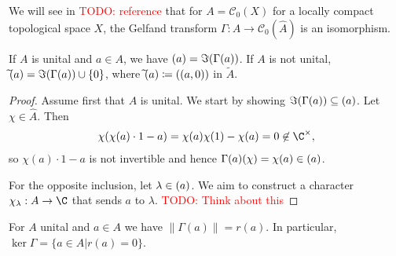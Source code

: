 \documentclass[american]{scrartcl}
\newcommand{\todo}[1]{\textcolor{red}{TODO: #1}}
\renewcommand{\norm}[1]{\left\lVert #1 \right\rVert}
\newcommand{\cC}{\mathcal{C}}
\let\sp\relax
\begin{document}
\begin{example}
	We will see in \todo{reference} that for $A=\cC_0(X)$ for a locally compact topological space $X$, the Gelfand transform $\Gamma\colon A\to \cC_0(\hat{A})$ is an isomorphism.
\end{example}
\begin{proposition}
	If $A$ is unital and $a\in A$, we have $\sp(a)=\Im(\Gamma(a))$. If $A$ is not unital, $\widetilde{\sp}(a)=\Im(\Gamma(a))\cup\{0\}$, where $\widetilde{\sp}(a)\coloneqq \sp{((a,0))}$ in $\tilde{A}$.
\end{proposition}
\begin{proof}
	Assume first that $A$ is unital. We start by showing $\Im(\Gamma(a))\subseteq \sp(a)$. Let $\chi\in\hat{A}$. Then
	\begin{align*}
		\chi(\chi(a)\cdot 1-a)=\chi(a)\chi(1)-\chi(a)=0\not\in\C^{\times},
	\end{align*}
	so $\chi(a)\cdot 1-a$ is not invertible and hence $\Gamma(a)(\chi)=\chi(a)\in \sp(a)$.
	
	For the opposite inclusion, let $\lambda\in \sp(a)$. We aim to construct a character $\chi_{\lambda}:A\to\C$ that sends $a$ to $\lambda$.
	\todo{Think about this}
\end{proof}
\begin{corollary}\label{Cor: Norm of Gelfand transform is spectral radius}
	For $A$ unital and $a\in A$ we have $\norm{\Gamma(a)}=r(a)$. In particular, $\ker \Gamma=\{a\in A|r(a)=0\}$.
\end{corollary}
\end{document}

